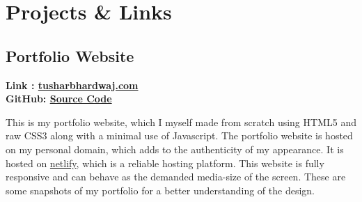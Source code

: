\documentclass{report}
\begin{document}
\newpage
\chapter{Projects \& Links}


\section{Portfolio Website} \par
{\bf Link : \href{https://tusharbhardwaj.com}{\color{blue}tusharbhardwaj.com}}\\
{\bf GitHub: \href{https://github.com/tusharrbhardwaj/myportfolio}{\color{blue}Source Code}} \\ \par
This is my portfolio website, which I myself made from scratch using HTML5 and raw CSS3 along with a minimal use of Javascript. The portfolio website is hosted on my personal domain, which adds to the authenticity of my appearance. It is hosted on \href{https://app.netlify.com}{\color{blue}netlify}, which is a reliable hosting platform. This website is fully responsive and can behave as the demanded media-size of the screen.
These are some snapshots of my portfolio for a better understanding of the design.
 
\end{document}
